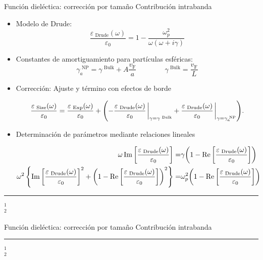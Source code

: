 \begin{frame}{Función dieléctica: corrección por tamaño}
{Contribución intrabanda}\small
\begin{itemize}
\item Modelo de Drude:
$$\frac{\varepsilon_\text{ Drude}(\omega)}{\varepsilon_0} = 1 - \frac{\omega_p^2}{\omega(\omega + i \gamma)} $$
\item Constantes de amortiguamiento para partículas esféricas:
$$ 
\gamma^\text{   NP}_a =  \gamma^\text{  Bulk} + A\frac{v_\text{F}}{a}
\qquad\qquad
\gamma^\text{   Bulk} = \frac{v_\text{F}}{L}
$$
\item Corrección: Ajuste y término con efectos de borde

\begin{align*}
\frac{\varepsilon_\text{  Size}(\omega)}{\varepsilon_0} =
	\frac{\varepsilon_\text{  Exp}(\omega)}{\varepsilon_0} +
 \qty(-
	 \frac{\varepsilon_\text{  Drude}(\omega)}{\varepsilon_0}
	 									\eval_{\gamma = \gamma^\text{   Bulk}}
	 +
	 \frac{\varepsilon_\text{  Drude}(\omega)}{\varepsilon_0}
 										\eval_{\gamma = \gamma^\text{   NP}_a} 	).
\end{align*}
\item Determinación de parámetros mediante relaciones lineales

\begin{align*}
\omega \Im\qty[\frac{\varepsilon_\text{  Drude}(\omega)}{\varepsilon_0}] =&
 \gamma \qty(1 - \Re\qty[\frac{\varepsilon_\text{  Drude}(\omega)}{\varepsilon_0}])\\
\omega^2\left\{ \Im\qty[\frac{\varepsilon_\text{  Drude}(\omega)}{\varepsilon_0}]^2
			+ \qty(1-\Re\qty[\frac{\varepsilon_\text{  Drude}(\omega)}{\varepsilon_0}])^2 \right\}
 =& \omega_p^2 \qty(1 - \Re\qty[\frac{\varepsilon_\text{  Drude}(\omega)}{\varepsilon_0}])
\end{align*}
\end{itemize}
%
	\noindent\rule{.25\textwidth}{0.4pt}
 \begin{spacing}{0}\fontsize{4}{12} \selectfont
	$^1$ \\
	$^2$ 
	\end{spacing}
\end{frame}

\begin{frame}{Función dieléctica: corrección por tamaño}
{Contribución intrabanda}\small
 \begin{figure} \centering
\def\svgwidth{.7\textwidth}
\end{figure}

	\noindent\rule{.25\textwidth}{0.4pt}
 \begin{spacing}{0}\fontsize{4}{12} \selectfont
	$^1$ \\
	$^2$ 
	\end{spacing}
\end{frame}


